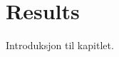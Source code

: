 \documentclass[../../main.tex]{subfiles}
\begin{document}

\chapter{Results}

Introduksjon til kapitlet.

\end{document}
